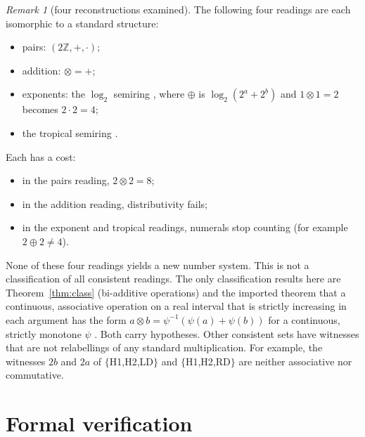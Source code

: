 \documentclass[11pt]{article}
\theoremstyle{remark}
\newtheorem{remark}{Remark}
\begin{document}
\begin{remark}[four reconstructions examined]
The following four readings are each isomorphic to a standard structure:
\begin{itemize}
\item pairs: $(2\mathbb Z,+,\cdot)$;
\item addition: $\otimes=+$;
\item exponents: the $\log_2$ semiring \cite{Litvinov}, where $\oplus$ is $\log_2(2^a+2^b)$ and $1\otimes 1=2$ becomes $2\cdot2=4$;
\item the tropical semiring \cite{MS}.
\end{itemize}
Each has a cost:
\begin{itemize}
\item in the pairs reading, $2\otimes2=8$;
\item in the addition reading, distributivity fails;
\item in the exponent and tropical readings, numerals stop counting (for example $2\oplus2\neq4$).
\end{itemize}
None of these four readings yields a new number system. This is not a classification of all consistent readings. The only classification results here are Theorem~\ref{thm:class} (bi-additive operations) and the imported theorem that a continuous, associative operation on a real interval that is strictly increasing in each argument has the form $a\otimes b=\psi^{-1}(\psi(a)+\psi(b))$ for a continuous, strictly monotone $\psi$ \cite{Aczel,CP}. Both carry hypotheses. Other consistent sets have witnesses that are not relabellings of any standard multiplication. For example, the witnesses $2b$ and $2a$ of $\{$H1,H2,LD$\}$ and $\{$H1,H2,RD$\}$ are neither associative nor commutative.
\end{remark}

\section{Formal verification}
\end{document}
